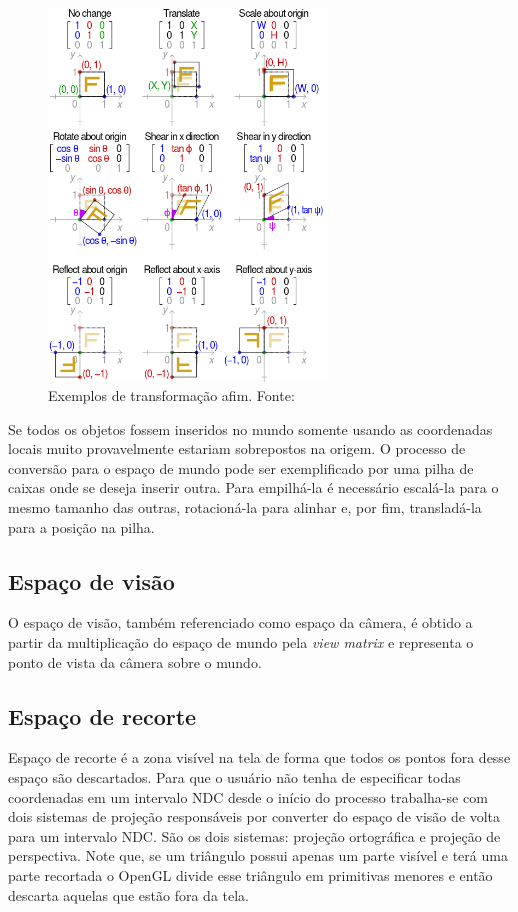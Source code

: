 \documentclass[12pt, 
openright, 
oneside, 
a4paper,    
brazil]{facom-ufu-abntex2}
\begin{document}
\begin{figure}[H]
	\centering
	\includegraphics[width=20em]{imagens/affineTransformation.png}
	\caption{Exemplos de transformação afim. Fonte:~\cite{AffineTransformationImg}}
	\label{fig:affineTransformation}
\end{figure}

Se todos os objetos fossem inseridos no mundo somente usando as coordenadas locais muito provavelmente estariam sobrepostos na origem. O processo de conversão para o espaço de mundo pode ser exemplificado por uma pilha de caixas onde se deseja inserir outra. Para empilhá-la é necessário escalá-la para o mesmo tamanho das outras, rotacioná-la para alinhar e, por fim, transladá-la para a posição na pilha.

\subsection{Espaço de visão}
O espaço de visão, também referenciado como espaço da câmera, é obtido a partir da multiplicação do espaço de mundo pela \textit{view matrix} e representa o ponto de vista da câmera sobre o mundo.

\subsection{Espaço de recorte}
Espaço de recorte é a zona visível na tela de forma que todos os pontos fora desse espaço são descartados. Para que o usuário não tenha de especificar todas coordenadas em um intervalo NDC desde o início do processo trabalha-se com dois sistemas de projeção responsáveis por converter do espaço de visão de volta para um intervalo NDC. São os dois sistemas: projeção ortográfica e projeção de perspectiva.
Note que, se um triângulo possui apenas um parte visível e terá uma parte recortada o OpenGL divide esse triângulo em primitivas menores e então descarta aquelas que estão fora da tela.
\end{document}
